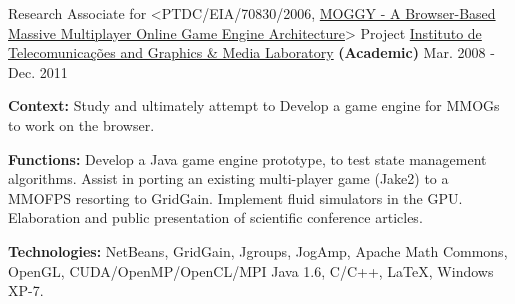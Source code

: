 \begin{cventries}
  \cventry
    {Research Associate for <PTDC/EIA/70830/2006, \href{http://www.di.ubi.pt/~agomes/moggy/index.html}{MOGGY - A Browser-Based Massive Multiplayer Online Game Engine Architecture}> Project} %
    {\href{http://www.it.ubi.pt/medialab}{Instituto de Telecomunica\c{c}\~{o}es and Graphics \& Media Laboratory} \textbf{(Academic)}} %
    {} %
    {Mar. 2008 - Dec. 2011} %
    {
      \begin{cvitems} %
		\item[] {\textbf{Context:} Study and ultimately attempt to Develop a game engine for MMOGs to work on the browser.}
		\item[] {\textbf{Functions:} Develop a Java game engine prototype, to test state management algorithms. Assist in porting an existing multi-player game (Jake2) to a MMOFPS resorting to GridGain. Implement fluid simulators in the GPU. Elaboration and public presentation of scientific conference articles.}
		\item[] {\textbf{Technologies:} %
\textcolor{rainbowcolor-olive}{NetBeans}, \textcolor{rainbowcolor-indigo}{GridGain}, \textcolor{rainbowcolor-indigo}{Jgroups}, \textcolor{rainbowcolor-indigo}{JogAmp}, \textcolor{rainbowcolor-indigo}{Apache Math Commons}, \textcolor{rainbowcolor-indigo}{OpenGL}, \textcolor{rainbowcolor-indigo}{CUDA/OpenMP/OpenCL/MPI}
\textcolor{rainbowcolor-indigo}{Java 1.6}, \textcolor{rainbowcolor-indigo}{C/C++}, \textcolor{rainbowcolor-indigo}{LaTeX}, %
\textcolor{rainbowcolor-orange}{Windows XP-7}.}
      \end{cvitems}
    }     
    

\end{cventries}
